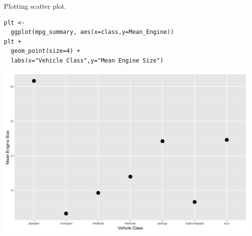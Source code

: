 \documentclass[11pt]{article}
\begin{document}
Plotting scatter plot.

\begin{verbatim}
plt <-
  ggplot(mpg_summary, aes(x=class,y=Mean_Engine))
plt +
  geom_point(size=4) +
  labs(x="Vehicle Class",y="Mean Engine Size")
\end{verbatim}

\begin{org}
\begin{center}
\includegraphics[width=.9\linewidth]{./resources/mpg_layer2.png}
\end{center}
\end{org}
\end{document}

